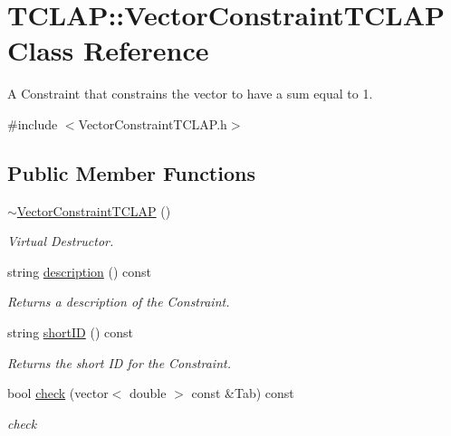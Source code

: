 \hypertarget{class_t_c_l_a_p_1_1_vector_constraint_t_c_l_a_p}{}\section{T\+C\+L\+AP\+:\+:Vector\+Constraint\+T\+C\+L\+AP Class Reference}
\label{class_t_c_l_a_p_1_1_vector_constraint_t_c_l_a_p}


A Constraint that constrains the vector to have a sum equal to 1.  




{\ttfamily \#include $<$Vector\+Constraint\+T\+C\+L\+A\+P.\+h$>$}

\subsection*{Public Member Functions}
\begin{DoxyCompactItemize}
\item 
\hyperlink{class_t_c_l_a_p_1_1_vector_constraint_t_c_l_a_p_a7e7bc9274a2fec7590046e1ee3d162cc}{$\sim$\+Vector\+Constraint\+T\+C\+L\+AP} ()
\begin{DoxyCompactList}\small\item\em Virtual Destructor. \end{DoxyCompactList}\item 
string \hyperlink{class_t_c_l_a_p_1_1_vector_constraint_t_c_l_a_p_afd3adf7e8e0ab6fac8ca3468fbb85b3d}{description} () const
\begin{DoxyCompactList}\small\item\em Returns a description of the Constraint. \end{DoxyCompactList}\item 
string \hyperlink{class_t_c_l_a_p_1_1_vector_constraint_t_c_l_a_p_a7f0263b2cbcff5fda6452dfe7f4dd028}{short\+ID} () const
\begin{DoxyCompactList}\small\item\em Returns the short ID for the Constraint. \end{DoxyCompactList}\item 
bool \hyperlink{class_t_c_l_a_p_1_1_vector_constraint_t_c_l_a_p_ab6af148ebdcd114490ff52e1c48af0c4}{check} (vector$<$ double $>$ const \&Tab) const
\begin{DoxyCompactList}\small\item\em check \end{DoxyCompactList}\end{DoxyCompactItemize}


